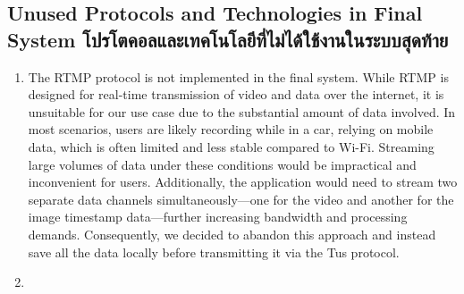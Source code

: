 \subsection{\ifenglish Unused Protocols and Technologies in Final System \else โปรโตคอลและเทคโนโลยีที่ไม่ได้ใช้งานในระบบสุดท้าย \fi}
\begin{enumerate}
    \item The RTMP protocol is not implemented in the final system. While RTMP is designed for real-time transmission of video and data over the internet, it is unsuitable for our use case due to the substantial amount of data involved. In most scenarios, users are likely recording while in a car, relying on mobile data, which is often limited and less stable compared to Wi-Fi. Streaming large volumes of data under these conditions would be impractical and inconvenient for users. Additionally, the application would need to stream two separate data channels simultaneously—one for the video and another for the image timestamp data—further increasing bandwidth and processing demands. Consequently, we decided to abandon this approach and instead save all the data locally before transmitting it via the Tus protocol.

    \item 
\end{enumerate}